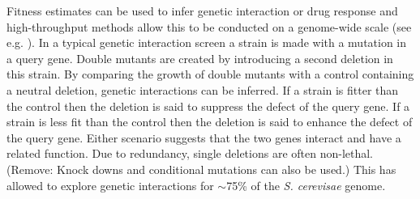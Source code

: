 Fitness estimates can be used to infer genetic interaction or drug
response and high-throughput methods allow this to be conducted on a
genome-wide scale (see e.g. \citet{Costanzo2010,Andrew2013}). In a
typical genetic interaction screen a strain is made with a mutation in
a query gene. Double mutants are created by introducing a second
deletion in this strain. By comparing the growth of double mutants
with a control containing a neutral deletion, genetic interactions can
be inferred. If a strain is fitter than the control then the deletion
is said to suppress the defect of the query gene. If a strain is less
fit than the control then the deletion is said to enhance the defect
of the query gene. Either scenario suggests that the two genes
interact and have a related function. Due to redundancy, single
deletions are often non-lethal. (Remove: Knock downs and conditional
mutations can also be used.) This has allowed \citet{Costanzo2010} to
explore genetic interactions for \(\sim\)75\% of the
\textit{S. cerevisae} genome.


